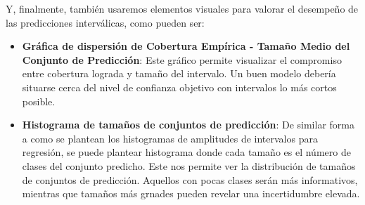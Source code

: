 Y, finalmente, también usaremos elementos visuales para valorar el desempeño de las predicciones interválicas, como pueden ser:

\begin{itemize}

    \item \textbf{Gráfica de dispersión de Cobertura Empírica - Tamaño Medio del Conjunto de Predicción}: Este gráfico permite visualizar el compromiso entre cobertura lograda y tamaño del intervalo. Un buen modelo debería situarse cerca del nivel de confianza objetivo con intervalos lo más cortos posible. 

    \item \textbf{Histograma de tamaños de conjuntos de predicción}: De similar forma a como se plantean los histogramas de amplitudes de intervalos para regresión, se puede plantear histograma donde cada tamaño es el número de clases del conjunto predicho. Este nos permite ver la distribución de tamaños de conjuntos de predicción. Aquellos con pocas clases serán más informativos, mientras que tamaños más grnades pueden revelar una incertidumbre elevada.
    
\end{itemize}
